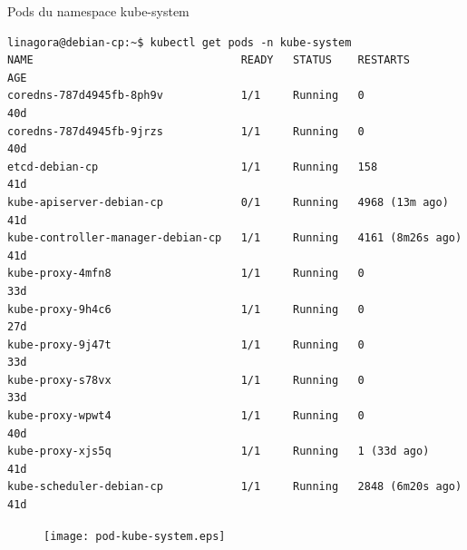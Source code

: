 
\begin{frame}[fragile]{Pods du namespace kube-system}

\begin{tiny}
\begin{Verbatim}[commandchars=\\\{\}]
linagora@debian-cp:~$ kubectl get pods -n kube-system
NAME                                READY   STATUS    RESTARTS           AGE
coredns-787d4945fb-8ph9v            1/1     Running   0                  40d
coredns-787d4945fb-9jrzs            1/1     Running   0                  40d
etcd-debian-cp                      1/1     Running   158                41d
kube-apiserver-debian-cp            0/1     Running   4968 (13m ago)     41d
kube-controller-manager-debian-cp   1/1     Running   4161 (8m26s ago)   41d
kube-proxy-4mfn8                    1/1     Running   0                  33d
kube-proxy-9h4c6                    1/1     Running   0                  27d
kube-proxy-9j47t                    1/1     Running   0                  33d
kube-proxy-s78vx                    1/1     Running   0                  33d
kube-proxy-wpwt4                    1/1     Running   0                  40d
kube-proxy-xjs5q                    1/1     Running   1 (33d ago)        41d
kube-scheduler-debian-cp            1/1     Running   2848 (6m20s ago)   41d
\end{Verbatim}
\end{tiny}

\begin{figure}
\begin{center}
\texttt{[image: pod-kube-system.eps]}
\end{center}
\end{figure}

\end{frame}


